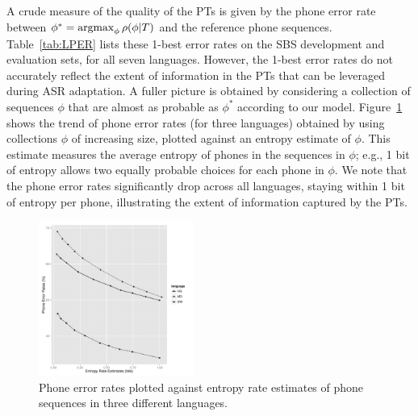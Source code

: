 A crude measure of the quality of the PTs is given by the phone error
rate between $\phi^* = \operatorname*{argmax}_{\phi} \rho(\phi|T)$ and the reference
phone sequences. Table~\ref{tab:LPER} lists these 1-best error rates
on the SBS development and evaluation sets, for all seven
languages. However, the 1-best error rates do not accurately reflect
the extent of information in the PTs that can be leveraged during ASR
adaptation. A fuller picture is obtained by considering a collection
of sequences $\phi$ that are almost as probable as $\phi^*$ according
to our model. Figure~\ref{fig:listPER} shows the trend of phone error
rates (for three languages) obtained by using collections $\phi$ of
increasing size, plotted against an entropy estimate of $\phi$. This
estimate measures the average entropy of phones in the sequences in
$\phi$; e.g., 1 bit of entropy allows two equally probable choices for
each phone in $\phi$. We note that the phone error rates significantly
drop across all languages, staying within 1 bit of entropy per phone,
illustrating the extent of information captured by the PTs.

\begin{figure}[t!]
\begin{center}
\includegraphics[width=2in]{../figs/listper.pdf}
\end{center}
\caption{Phone error rates plotted against entropy rate estimates of phone sequences in three different languages.}
\label{fig:listPER}
\end{figure}
